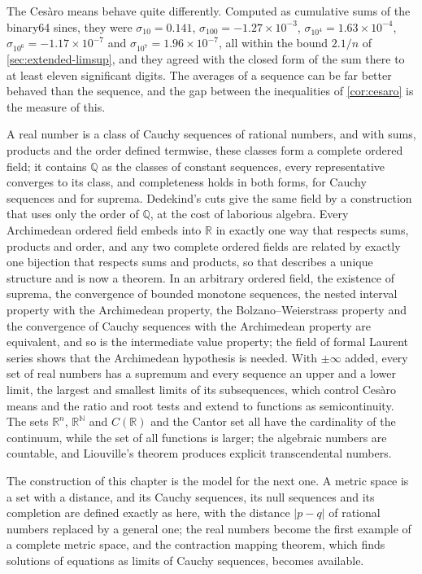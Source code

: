 The Ces\`aro means behave quite differently. Computed as cumulative sums of the binary64 sines, they were $\sigma_{10}=0.141$, $\sigma_{100}=-1.27\times10^{-3}$, $\sigma_{10^4}=1.63\times10^{-4}$, $\sigma_{10^6}=-1.17\times10^{-7}$ and $\sigma_{10^7}=1.96\times10^{-7}$, all within the bound $2.1/n$ of \cref{sec:extended-limsup}, and they agreed with the closed form of the sum there to at least eleven significant digits. The averages of a sequence can be far better behaved than the sequence, and the gap between the inequalities of \cref{cor:cesaro} is the measure of this.

\bigskip
A real number is a class of Cauchy sequences of rational numbers, and with sums, products and the order defined termwise, these classes form a complete ordered field; it contains $\mathbb Q$ as the classes of constant sequences, every representative converges to its class, and completeness holds in both forms, for Cauchy sequences and for suprema. Dedekind's cuts give the same field by a construction that uses only the order of $\mathbb Q$, at the cost of laborious algebra. Every Archimedean ordered field embeds into $\mathbb R$ in exactly one way that respects sums, products and order, and any two complete ordered fields are related by exactly one bijection that respects sums and products, so that  describes a unique structure and is now a theorem. In an arbitrary ordered field, the existence of suprema, the convergence of bounded monotone sequences, the nested interval property with the Archimedean property, the Bolzano--Weierstrass property and the convergence of Cauchy sequences with the Archimedean property are equivalent, and so is the intermediate value property; the field of formal Laurent series shows that the Archimedean hypothesis is needed. With $\pm\infty$ added, every set of real numbers has a supremum and every sequence an upper and a lower limit, the largest and smallest limits of its subsequences, which control Ces\`aro means and the ratio and root tests and extend to functions as semicontinuity. The sets $\mathbb R^n$, $\mathbb R^{\mathbb N}$ and $C(\mathbb R)$ and the Cantor set all have the cardinality of the continuum, while the set of all functions is larger; the algebraic numbers are countable, and Liouville's theorem produces explicit transcendental numbers.

The construction of this chapter is the model for the next one. A metric space is a set with a distance, and its Cauchy sequences, its null sequences and its completion are defined exactly as here, with the distance $|p-q|$ of rational numbers replaced by a general one; the real numbers become the first example of a complete metric space, and the contraction mapping theorem, which finds solutions of equations as limits of Cauchy sequences, becomes available.

